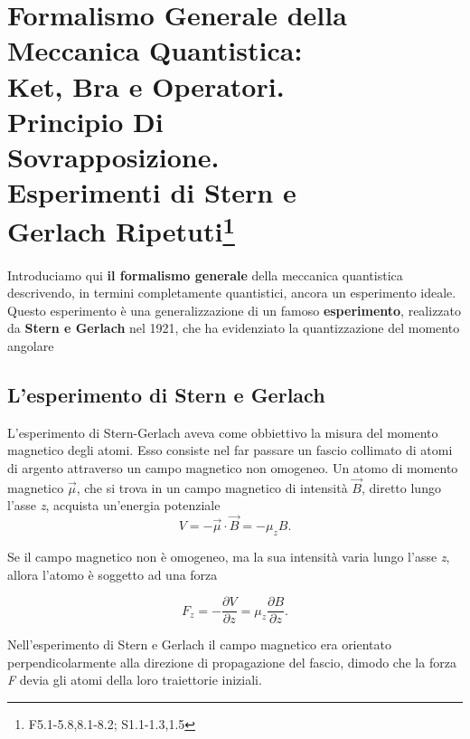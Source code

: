 \chapter[Formalismo Generale della M.Q.]{Formalismo Generale della Meccanica Quantistica: \\Ket, Bra e Operatori.\\Principio Di\\ Sovrapposizione.\\ Esperimenti di Stern e\\ Gerlach Ripetuti\footnote{F5.1-5.8,8.1-8.2; S1.1-1.3,1.5}}
 
Introduciamo qui \textbf{il formalismo generale} della meccanica quantistica descrivendo, in termini completamente quantistici, ancora un esperimento ideale. Questo esperimento è una generalizzazione di un famoso \textbf{esperimento}, realizzato da \textbf{Stern e Gerlach} nel 1921, che ha evidenziato la quantizzazione del momento angolare
 
\section{L'esperimento di Stern e Gerlach}
 L'esperimento di Stern-Gerlach aveva come obbiettivo la misura del momento magnetico degli atomi. Esso consiste nel far passare un fascio collimato di atomi di argento attraverso un campo magnetico non omogeneo. Un atomo di momento magnetico $\vec \mu$, che si trova in un campo magnetico di intensità $\vec B$, diretto lungo l'asse \emph{z}, acquista un'energia potenziale
\begin{equation}
V= -\vec \mu \cdot \vec B= -\mu_zB .
\end{equation} 

Se il campo magnetico non è omogeneo, ma la sua intensità varia lungo l'asse \emph{z}, allora l'atomo è soggetto ad una forza

\begin{equation}
F_z= - \frac{\partial V}{\partial z}= \mu_z\frac{\partial B}{\partial z} .
\end{equation}

Nell'esperimento di Stern e Gerlach il campo magnetico era orientato perpendicolarmente alla direzione di propagazione del fascio, dimodo che la forza \emph{F} devia gli atomi della loro traiettorie iniziali.

